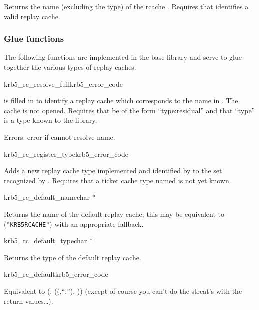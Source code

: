 Returns the name (excluding the type) of the rcache .
Requires that  identifies a valid replay cache.

\subsubsection{Glue functions}
The following functions are implemented in the base library and serve to
glue together the various types of replay caches.

\begin{funcdecl}{krb5_rc_resolve_full}{krb5_error_code}{\funcinout}
\funcin
{}
\end{funcdecl}

 is filled in to identify a replay cache which
corresponds to the name in .  The cache is not opened.
Requires that  be of the form ``type:residual''
and that ``type'' is a type known to the library.

Errors: error if cannot resolve name.

\begin{funcdecl}{krb5_rc_register_type}{krb5_error_code}{\funcin}
\end{funcdecl}
Adds a new replay cache type implemented and identified by
 to the set recognized by
.  Requires that a ticket cache type named
 is not yet known.


\begin{funcdecl}{krb5_rc_default_name}{char *}{\funcvoid}
\end{funcdecl}
Returns  the name of the default replay cache; this may be equivalent to
({\tt "KRB5RCACHE"}) with an appropriate fallback.

\begin{funcdecl}{krb5_rc_default_type}{char *}{\funcvoid}
\end{funcdecl}

Returns the type of the default replay cache.

\begin{funcdecl}{krb5_rc_default}{krb5_error_code}{\funcinout}
\end{funcdecl}
Equivalent to (,
((,``:''),
)) (except of course you can't do the
strcat's with the return values\ldots).
